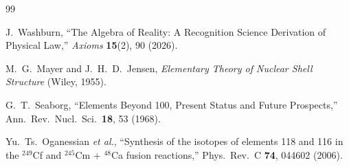 \documentclass[12pt,a4paper]{article}
\theoremstyle{definition}
\theoremstyle{remark}
\begin{document}
\begin{thebibliography}{99}

J.~Washburn, ``The Algebra of Reality: A Recognition Science Derivation
of Physical Law,'' \emph{Axioms} \textbf{15}(2), 90 (2026).

M.~G.~Mayer and J.~H.~D.~Jensen, \textit{Elementary Theory of
Nuclear Shell Structure} (Wiley, 1955).

G.~T.~Seaborg, ``Elements Beyond 100, Present Status and Future
Prospects,'' Ann.\ Rev.\ Nucl.\ Sci.\ \textbf{18}, 53 (1968).

Yu.~Ts.~Oganessian \textit{et al.}, ``Synthesis of the isotopes of
elements 118 and 116 in the ${}^{249}$Cf and ${}^{245}$Cm +
${}^{48}$Ca fusion reactions,'' Phys.\ Rev.\ C \textbf{74}, 044602
(2006).

\end{thebibliography}
\end{document}
